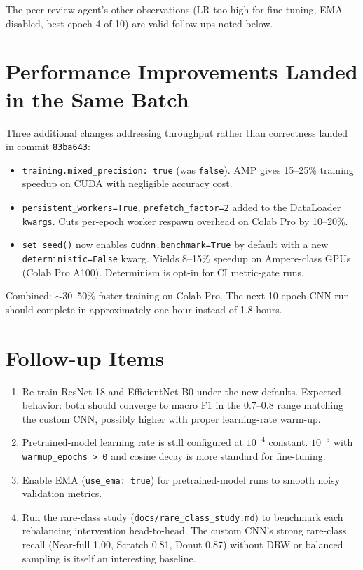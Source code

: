 \documentclass[conference]{IEEEtran}
\begin{document}
The peer-review agent's other observations (LR too high for fine-tuning,
EMA disabled, best epoch 4 of 10) are valid follow-ups noted below.

\section{Performance Improvements Landed in the Same Batch}

Three additional changes addressing throughput rather than correctness
landed in commit \texttt{83ba643}:

\begin{itemize}
\item \texttt{training.mixed\_precision: true} (was \texttt{false}). AMP
gives 15--25\% training speedup on CUDA with negligible accuracy cost.
\item \texttt{persistent\_workers=True}, \texttt{prefetch\_factor=2} added
to the DataLoader \texttt{kwargs}. Cuts per-epoch worker respawn overhead
on Colab Pro by 10--20\%.
\item \texttt{set\_seed()} now enables \texttt{cudnn.benchmark=True} by
default with a new \texttt{deterministic=False} kwarg. Yields 8--15\%
speedup on Ampere-class GPUs (Colab Pro A100). Determinism is opt-in for
CI metric-gate runs.
\end{itemize}

Combined: $\sim$30--50\% faster training on Colab Pro. The next 10-epoch
CNN run should complete in approximately one hour instead of 1.8 hours.

\section{Follow-up Items}

\begin{enumerate}
\item Re-train ResNet-18 and EfficientNet-B0 under the new defaults.
Expected behavior: both should converge to macro F1 in the 0.7--0.8 range
matching the custom CNN, possibly higher with proper learning-rate warm-up.
\item Pretrained-model learning rate is still configured at $10^{-4}$
constant. $10^{-5}$ with \texttt{warmup\_epochs > 0} and cosine decay
is more standard for fine-tuning.
\item Enable EMA (\texttt{use\_ema: true}) for pretrained-model runs to
smooth noisy validation metrics.
\item Run the rare-class study (\texttt{docs/rare\_class\_study.md}) to
benchmark each rebalancing intervention head-to-head. The custom CNN's
strong rare-class recall (Near-full 1.00, Scratch 0.81, Donut 0.87)
without DRW or balanced sampling is itself an interesting baseline.
\end{enumerate}
\end{document}
